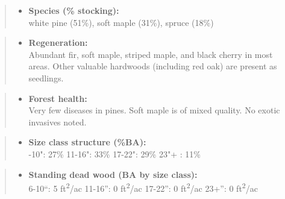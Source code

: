 \documentclass[]{tufte-handout}
\providecommand{\tightlist}{%
  \setlength{\itemsep}{0pt}\setlength{\parskip}{0pt}}
\begin{document}
\begin{quote}
\begin{itemize}
\tightlist
\item
  \textbf{Species (\% stocking):}\\
  \vspace{2pt} white pine (51\%), soft maple (31\%), spruce (18\%)
\end{itemize}
\end{quote}

\begin{quote}
\begin{itemize}
\tightlist
\item
  \textbf{Regeneration:}\\
  \vspace{2pt} Abundant fir, soft maple, striped maple, and black cherry
  in most areas. Other valuable hardwoods (including red oak) are
  present as seedlings.
\end{itemize}
\end{quote}

\begin{quote}
\begin{itemize}
\tightlist
\item
  \textbf{Forest health:}\\
  \vspace{2pt} Very few diseases in pines. Soft maple is of mixed
  quality. No exotic invasives noted.
\end{itemize}
\end{quote}

\begin{quote}
\begin{itemize}
\tightlist
\item
  \textbf{Size class structure (\%BA):}\\
  \vspace{2pt} -10": 27\% \textbar{} 11-16": 33\% \textbar{}
  17-22": 29\% \textbar{} 23"+ : 11\%
\end{itemize}
\end{quote}

\begin{quote}
\begin{itemize}
\tightlist
\item
  \textbf{Standing dead wood (BA by size class):}\\
  \vspace{2pt} \indent \small 6-10``: 5 ft\textsuperscript{2}/ac
  \textbar{} 11-16'': 0 ft\textsuperscript{2}/ac \textbar{} 17-22'': 0
  ft\textsuperscript{2}/ac \textbar{} 23+'': 0 ft\textsuperscript{2}/ac
\end{itemize}
\end{quote}
\end{document}
